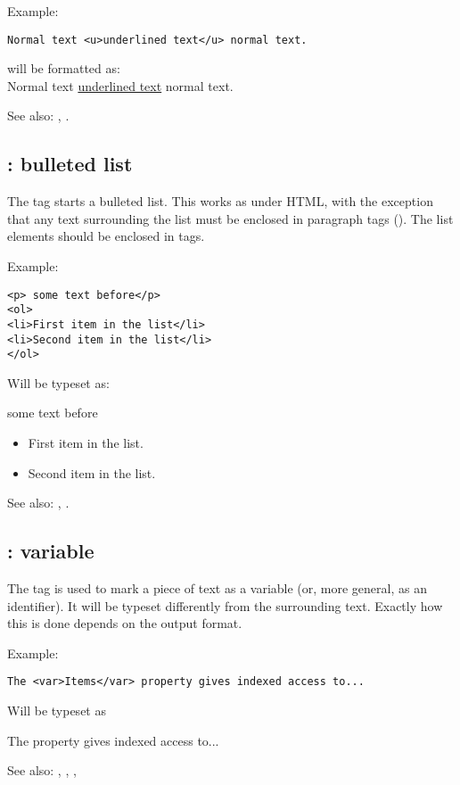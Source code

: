 Example:
\begin{verbatim}
Normal text <u>underlined text</u> normal text.
\end{verbatim}
will be formatted as:\\
Normal text \underline{underlined text} normal text.

See also: , .

\subsection{ : bulleted list}
\label{tag:ul}
The  tag starts a bulleted list. This works as under HTML, with the
exception that any text surrounding the list must be enclosed in paragraph
tags (). The list elements should be enclosed in  tags.

Example:
\begin{verbatim}
<p> some text before</p>
<ol>
<li>First item in the list</li>
<li>Second item in the list</li>
</ol>
\end{verbatim}
Will be typeset as:

some text before
\begin{itemize}
\item First item in the list.
\item Second item in the list.
\end{itemize}

See also: , .

\subsection{ : variable}
\label{tag:var}
The  tag is used to mark a piece of text as a variable (or, more
general, as an identifier). It will be typeset differently from the 
surrounding text. Exactly how this is done depends on the output format.

Example:
\begin{verbatim}
The <var>Items</var> property gives indexed access to...
\end{verbatim}
Will be typeset as

The  property gives indexed access to...

See also: , , , 



